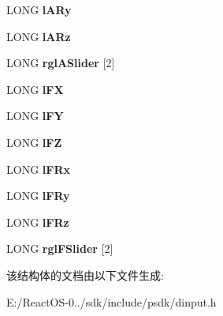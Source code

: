 \begin{DoxyCompactItemize}
\mbox{\label{struct_d_i_j_o_y_s_t_a_t_e2_a35a38ce4148f2049423fb1f7b9592d53}} 
L\+O\+NG {\bfseries l\+A\+Ry}
\item 
\mbox{\label{struct_d_i_j_o_y_s_t_a_t_e2_a8fd6abb5b4987c133fb49f10f4f98918}} 
L\+O\+NG {\bfseries l\+A\+Rz}
\item 
\mbox{\label{struct_d_i_j_o_y_s_t_a_t_e2_a07cfa7a3a169b9288096be4cf037bfd1}} 
L\+O\+NG {\bfseries rgl\+A\+Slider} \mbox{[}2\mbox{]}
\item 
\mbox{\label{struct_d_i_j_o_y_s_t_a_t_e2_a5cee35c66ed45c265dd87601058965c5}} 
L\+O\+NG {\bfseries l\+FX}
\item 
\mbox{\label{struct_d_i_j_o_y_s_t_a_t_e2_a5a86f1ad6cd84caf7f2ce7f297af4434}} 
L\+O\+NG {\bfseries l\+FY}
\item 
\mbox{\label{struct_d_i_j_o_y_s_t_a_t_e2_af7159fffe6a7ba3c06df759a84cb3603}} 
L\+O\+NG {\bfseries l\+FZ}
\item 
\mbox{\label{struct_d_i_j_o_y_s_t_a_t_e2_a2c9a66890492b88f9d95a6c1165b784d}} 
L\+O\+NG {\bfseries l\+F\+Rx}
\item 
\mbox{\label{struct_d_i_j_o_y_s_t_a_t_e2_a0bc8541c56d9f6eca618f85fea782070}} 
L\+O\+NG {\bfseries l\+F\+Ry}
\item 
\mbox{\label{struct_d_i_j_o_y_s_t_a_t_e2_a40943bc6f0c92b0b05bd70ae73a3bc35}} 
L\+O\+NG {\bfseries l\+F\+Rz}
\item 
\mbox{\label{struct_d_i_j_o_y_s_t_a_t_e2_a071b194919680e21287b4811512e3432}} 
L\+O\+NG {\bfseries rgl\+F\+Slider} \mbox{[}2\mbox{]}
\end{DoxyCompactItemize}


该结构体的文档由以下文件生成\+:\begin{DoxyCompactItemize}
\item 
E\+:/\+React\+O\+S-\/0../sdk/include/psdk/dinput.\+h\end{DoxyCompactItemize}
